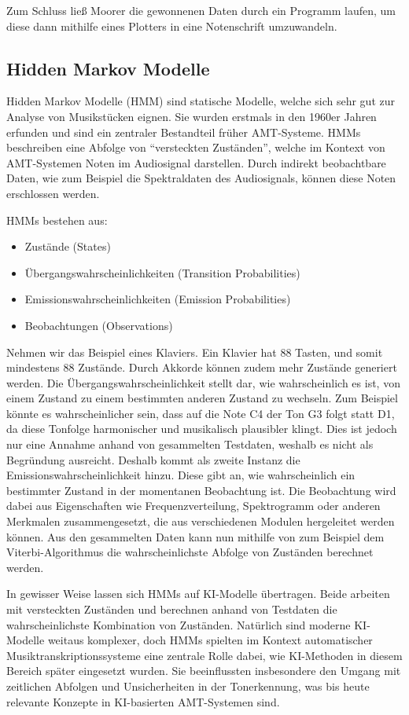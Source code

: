 Zum Schluss ließ Moorer die gewonnenen Daten durch ein Programm laufen, 
um diese dann mithilfe eines Plotters in eine Notenschrift umzuwandeln.

\subsection{Hidden Markov Modelle}\label{subsec:hiddenMarkov}
Hidden Markov Modelle (HMM) sind statische Modelle, welche sich sehr gut zur Analyse von Musikstücken eignen.
Sie wurden erstmals in den 1960er Jahren erfunden \cite{baum1970maximization} und
sind ein zentraler Bestandteil früher AMT-Systeme.
HMMs beschreiben eine Abfolge von \enquote{versteckten Zuständen},
welche im Kontext von AMT-Systemen Noten im Audiosignal darstellen.
Durch indirekt beobachtbare Daten, wie zum Beispiel die Spektraldaten des Audiosignals,
können diese Noten erschlossen werden.

HMMs bestehen aus:
\begin{itemize}
    \item Zustände (States)
    \item Übergangswahrscheinlichkeiten (Transition Probabilities)
    \item Emissionswahrscheinlichkeiten (Emission Probabilities)
    \item Beobachtungen (Observations)
\end{itemize}
Nehmen wir das Beispiel eines Klaviers.
Ein Klavier hat 88 Tasten, und somit mindestens 88 Zustände.
Durch Akkorde können zudem mehr Zustände generiert werden.
Die Übergangswahrscheinlichkeit stellt dar,
wie wahrscheinlich es ist, von einem Zustand zu einem bestimmten anderen Zustand zu wechseln.
Zum Beispiel könnte es wahrscheinlicher sein, dass auf die Note C4 der Ton G3 folgt statt D1,
da diese Tonfolge harmonischer und musikalisch plausibler klingt.
Dies ist jedoch nur eine Annahme anhand von gesammelten Testdaten, weshalb es nicht als Begründung ausreicht.
Deshalb kommt als zweite Instanz die Emissionswahrscheinlichkeit hinzu.
Diese gibt an, wie wahrscheinlich ein bestimmter Zustand in der momentanen Beobachtung ist.
Die Beobachtung wird dabei aus Eigenschaften wie Frequenzverteilung,
Spektrogramm oder anderen Merkmalen zusammengesetzt, die aus verschiedenen Modulen hergeleitet werden können.
Aus den gesammelten Daten kann nun mithilfe von zum Beispiel dem Viterbi-Algorithmus \cite{takeda2002hidden} die
wahrscheinlichste Abfolge von Zuständen berechnet werden.

In gewisser Weise lassen sich HMMs auf KI-Modelle übertragen.
Beide arbeiten mit versteckten Zuständen und
berechnen anhand von Testdaten die wahrscheinlichste Kombination von Zuständen.
Natürlich sind moderne KI-Modelle weitaus komplexer,
doch HMMs spielten im Kontext automatischer Musiktranskriptionssysteme eine zentrale Rolle dabei,
wie KI-Methoden in diesem Bereich später eingesetzt wurden.
Sie beeinflussten insbesondere den Umgang mit zeitlichen Abfolgen
und Unsicherheiten in der Tonerkennung,
was bis heute relevante Konzepte in KI-basierten AMT-Systemen sind.


